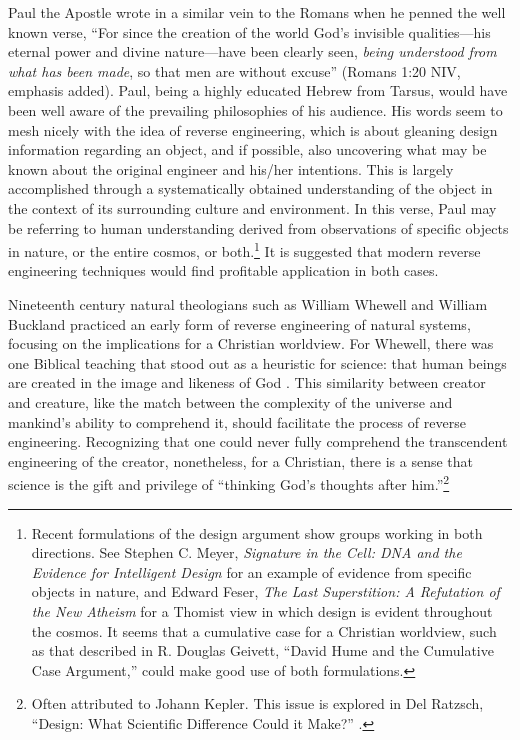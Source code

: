 Paul the Apostle wrote in a similar vein to the Romans when he penned
the well known verse, “For since the creation of the
world God's invisible qualities---his eternal power
and divine nature---have been clearly seen,
\textit{being understood from what has been
made}, so that men are without
excuse” (Romans 1:20 NIV, emphasis added).
Paul, being a highly educated Hebrew from Tarsus, would have been well
aware of the prevailing philosophies of his audience. His words seem to
mesh nicely with the idea of reverse engineering, which is about
gleaning design information regarding an object,
and if possible, also uncovering what may be
known about the original engineer and his/her
intentions. This is largely accomplished through a
systematically obtained understanding of the object in the context of
its surrounding culture and environment. In this verse, Paul may be
referring to human understanding derived from observations of specific
objects in nature, or the entire cosmos, or
both.\footnote{%
Recent formulations of the design argument show
groups working in both directions. See Stephen C. Meyer,
\textit{Signature in the Cell: DNA and the Evidence for Intelligent
Design} \citep{meyer2009} for an example of evidence from
specific objects in nature, and Edward Feser, \textit{The Last
Superstition: A Refutation of the New Atheism} \citep{feser2008}
for a Thomist view in which design is evident
throughout the cosmos. It seems that a cumulative case for a Christian
worldview, such as that described in R. Douglas Geivett, “David Hume
and the Cumulative Case Argument,” \citep{geivett2005}
could make
good use of both formulations.
}
It is
suggested that modern reverse engineering techniques would find
profitable application in both cases.

Nineteenth century natural theologians such as William Whewell and
William Buckland practiced an early form of reverse engineering of
natural systems, focusing on the implications for a Christian
worldview. For Whewell, there was one Biblical teaching that stood out
as a heuristic for science: that human beings are created in the image
and likeness of God \citep[][p.~283]{fuller2006}. This similarity between
creator and creature, like the match between the complexity of the
universe and mankind’s ability to comprehend it, should facilitate the
process of reverse engineering. Recognizing that one could never fully
comprehend the transcendent engineering of the creator, nonetheless,
for a Christian, there is a sense that science is the gift and
privilege of ``thinking God’s thoughts after him.''\footnote{%
Often attributed to Johann Kepler. This issue is
explored in Del Ratzsch, ``Design: What Scientific Difference Could it
Make?'' \citep{ratzsch2004}.
}

